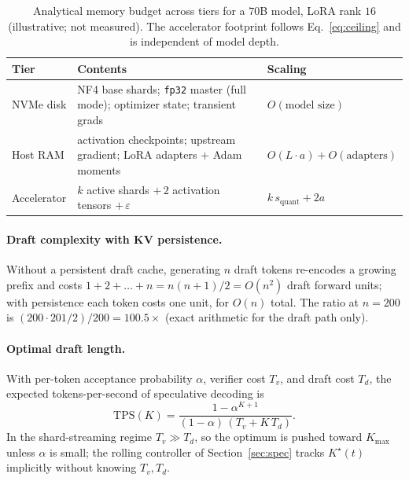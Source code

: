 \documentclass{article}
\begin{document}
\begin{table}[t]
  \centering
  \caption{Analytical memory budget across tiers for a $70$B model, LoRA rank
  $16$ (illustrative; not measured). The accelerator footprint follows
  Eq.~\eqref{eq:ceiling} and is independent of model depth.}
  \label{tab:budget}
  \begin{tabular}{@{}lll@{}}
    \toprule
    \textbf{Tier} & \textbf{Contents} & \textbf{Scaling} \\
    \midrule
    NVMe disk & NF4 base shards; \texttt{fp32} master (full mode); optimizer state; transient grads & $O(\text{model size})$ \\
    Host RAM & activation checkpoints; upstream gradient; LoRA adapters + Adam moments & $O(L \cdot a) + O(\text{adapters})$ \\
    Accelerator & $k$ active shards $+\,2$ activation tensors $+\,\varepsilon$ & $k\,s_{\mathrm{quant}} + 2a$ \\
    \bottomrule
  \end{tabular}
\end{table}

\paragraph{Draft complexity with KV persistence.}
Without a persistent draft cache, generating $n$ draft tokens re-encodes a growing
prefix and costs $1+2+\dots+n = n(n{+}1)/2 = O(n^2)$ draft forward units; with
persistence each token costs one unit, for $O(n)$ total. The ratio at $n=200$ is
$(200\cdot 201/2)/200 = 100.5\times$ (exact arithmetic for the draft path only).

\paragraph{Optimal draft length.}
With per-token acceptance probability $\alpha$, verifier cost $T_v$, and draft
cost $T_d$, the expected tokens-per-second of speculative decoding is
\begin{equation}
  \mathrm{TPS}(K) = \frac{1-\alpha^{K+1}}{(1-\alpha)\,(T_v + K\,T_d)}.
  \label{eq:tps}
\end{equation}
In the shard-streaming regime $T_v \gg T_d$, so the optimum is pushed toward
$K_{\max}$ unless $\alpha$ is small; the rolling controller of
Section~\ref{sec:spec} tracks $K^\star(t)$ implicitly without knowing
$T_v,T_d$.
\end{document}
